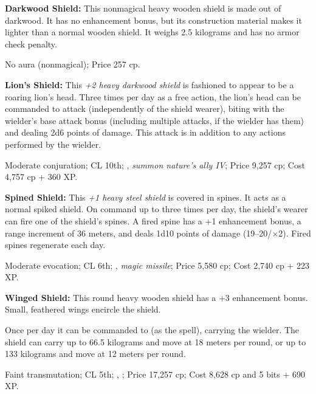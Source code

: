 \textbf{Darkwood Shield:} This nonmagical heavy wooden shield is made out of darkwood. It has no enhancement bonus, but its construction material makes it lighter than a normal wooden shield. It weighs 2.5 kilograms and has no armor check penalty.

No aura (nonmagical); Price 257 cp.

\textbf{Lion's Shield:} This \emph{+2 heavy darkwood shield} is fashioned to appear to be a roaring lion's head. Three times per day as a free action, the lion's head can be commanded to attack (independently of the shield wearer), biting with the wielder's base attack bonus (including multiple attacks, if the wielder has them) and dealing 2d6 points of damage. This attack is in addition to any actions performed by the wielder.

Moderate conjuration; CL 10th; , \emph{summon nature's ally IV}; Price 9,257 cp; Cost 4,757 cp + 360 XP.

\textbf{Spined Shield:} This \emph{+1 heavy steel shield} is covered in spines. It acts as a normal spiked shield. On command up to three times per day, the shield's wearer can fire one of the shield's spines. A fired spine has a +1 enhancement bonus, a range increment of 36 meters, and deals 1d10 points of damage (19--20/$\times$2). Fired spines regenerate each day.

Moderate evocation; CL 6th; , \emph{magic missile}; Price 5,580 cp; Cost 2,740 cp + 223 XP.

\textbf{Winged Shield:} This round heavy wooden shield has a +3 enhancement bonus. Small, feathered wings encircle the shield.

Once per day it can be commanded to  (as the spell), carrying the wielder. The shield can carry up to 66.5 kilograms and move at 18 meters per round, or up to 133 kilograms and move at 12 meters per round.

Faint transmutation; CL 5th; , ; Price 17,257 cp; Cost 8,628 cp and 5 bits + 690 XP.
